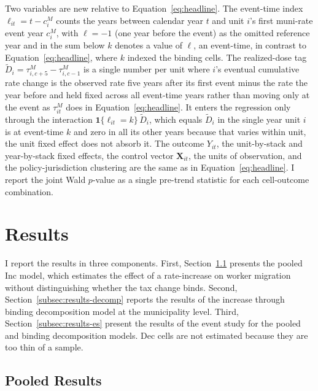 \documentclass[12pt]{article}
\begin{document}
Two variables are new relative to Equation~\ref{eq:headline}. The
event-time index $\ell_{it} = t - c^M_i$ counts the years between
calendar year $t$ and unit $i$'s first muni-rate event year $c^M_i$,
with $\ell = -1$ (one year before the event) as the omitted
reference year and in the sum below $k$ denotes a value of $\ell$, an
event-time, in contrast to Equation~\ref{eq:headline}, where $k$
indexed the binding cells. The realized-dose tag
$\widetilde{D}_i = \tau^M_{i, c+5} - \tau^M_{i, c-1}$ is a single number per unit where $i$'s eventual cumulative rate
change is the observed rate five years after its first event minus the
rate the year before and held fixed across all event-time years rather
than moving only at the event as $\tau^M_{it}$ does in
Equation~\ref{eq:headline}. It enters the regression only through the
interaction $\mathbf{1}\{\ell_{it}=k\}\,\widetilde{D}_i$, which equals
$\widetilde{D}_i$ in the single year unit $i$ is at event-time $k$ and
zero in all its other years because that varies within unit, the
unit fixed effect does not
absorb it. The outcome $Y_{it}$, the unit-by-stack and year-by-stack
fixed effects, the control vector $\mathbf{X}_{it}$, the units of
observation, and the policy-jurisdiction clustering are the same
as in Equation~\ref{eq:headline}. I report the
joint Wald $p$-value as a single pre-trend
statistic for each cell-outcome combination.

\section{Results}
\label{sec:results}

I report the results in three components. First,
Section~\ref{subsec:results-pooled} presents the pooled Inc model, which estimates the effect of a rate-increase on worker migration without
distinguishing whether the tax change binds. Second,
Section~\ref{subsec:results-decomp} reports the results of the increase through binding
decomposition model at the municipality level. Third, Section~\ref{subsec:results-es} present the results of the event study for the pooled and binding decomposition models.
Dec cells are not estimated because they are too thin of a sample.

\subsection{Pooled Results}
\label{subsec:results-pooled}
\end{document}
